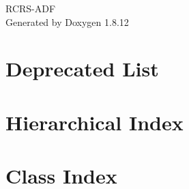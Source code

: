 \documentclass[twoside]{book}
\newcommand{\+}{\discretionary{\mbox{\scriptsize$\hookleftarrow$}}{}{}}
\newcommand{\clearemptydoublepage}{%
  \newpage{\pagestyle{empty}\cleardoublepage}%
}
\begin{document}
\hypersetup{pageanchor=false,
             bookmarksnumbered=true,
             pdfencoding=unicode
            }
\begin{titlepage}
\vspace*{7cm}
\begin{center}%
{\Large R\+C\+R\+S-\/\+A\+DF }\\
\vspace*{1cm}
{\large Generated by Doxygen 1.8.12}\\
\end{center}
\end{titlepage}
\clearemptydoublepage
{}
\tableofcontents
\clearemptydoublepage
{}
\hypersetup{pageanchor=true}

\chapter{Deprecated List}
\label{deprecated}
\hypertarget{deprecated}{}

\chapter{Hierarchical Index}

\chapter{Class Index}

\end{document}
